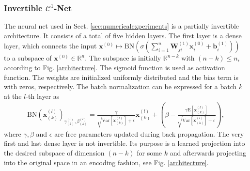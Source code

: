 \documentclass[envcountsect,runningheads]{llncs}
\begin{document}
\subsubsection{Invertible $\mathcal{C}^1$-Net}
\label{appx:invarch}
The neural net used in Sect. \ref{sec:numericalexperiments} is a partially invertible architecture. It consists of a total of five hidden layers. The first layer is a dense layer, which connects the input $\mathbf{x}^{(0)} \mapsto \text{BN}\left(\sigma\left(\sum_{i=1}^{n} \textbf{W}^{(1)}_{ji}\mathbf{x}^{(0)}_{i} + \mathbf{b}^{(1)}_{i}\right)\right)$ to a subspace of $\mathbf{x}^{(0)} \in \mathbb{R}^n$. The subspace is initially $\mathbb{R}^{n-k}$ with $(n-k) \leq n$, according to Fig. \ref{architecture}. The sigmoid function is used as activation function. The weights are initialized uniformly distributed and the bias term is with zeros, respectively. The batch normalization can be expressed for a batch $k$ at the $l$-th layer as
\begin{align}
	\text{BN}(\mathbf{x}^{(l)}_{(k)})_{\gamma^{(l)}_{(k)},\beta^{(l)}_{(k)}} = \frac{\gamma}{\sqrt{\text{Var}[\mathbf{x}^{(l)}_{(k)}] + \epsilon}} \mathbf{x}^{(l)}_{(k)} + \left( \beta - \frac{\gamma \text{E}[\mathbf{x}^{(l)}_{(k)}]}{\sqrt{\text{Var}[\mathbf{x}^{(l)}_{(k)}]+\epsilon}} \right),
\end{align}
where $\gamma,\beta$ and $\epsilon$ are free parameters updated during back propagation. The very first and last dense layer is not invertible. Its purpose is a learned projection into the desired subspace of dimension $(n-k)$ for some $k$ and afterwards projecting into the original space in an encoding fashion, see Fig. \ref{architecture}.
\end{document}
